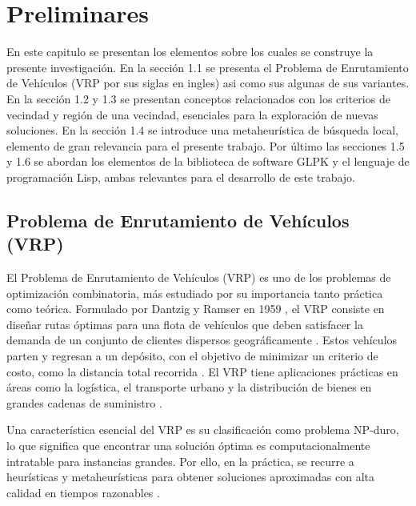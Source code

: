 \documentclass{article}
\begin{document}
\section{Preliminares}
En este capitulo se presentan los elementos sobre los cuales se construye la presente investigación. En la sección 1.1 se presenta el Problema de Enrutamiento de Vehículos (VRP por sus siglas en ingles) asi como sus algunas de sus variantes. En la sección 1.2 y 1.3 se presentan conceptos relacionados con los criterios de vecindad y región de una vecindad, esenciales para la exploración de nuevas soluciones. En la sección 1.4 se introduce una metaheurística de búsqueda local, elemento de gran relevancia para el presente trabajo. Por último las secciones 1.5 y 1.6  se abordan los elementos de la biblioteca de software GLPK y el lenguaje de programación Lisp, ambas relevantes para el desarrollo de este trabajo. 
\subsection{Problema de Enrutamiento de Vehículos (VRP)}
El Problema de Enrutamiento de Vehículos (VRP) es uno de los problemas de optimización combinatoria,  más estudiado por su importancia tanto práctica como teórica. Formulado por Dantzig y Ramser en 1959 \cite{ref18}, el VRP consiste en diseñar rutas óptimas para una flota de vehículos que deben satisfacer la demanda de un conjunto de clientes dispersos geográficamente \cite{ref2}. Estos vehículos parten y regresan a un depósito, con el objetivo de minimizar un criterio de costo, como la distancia total recorrida \cite{ref3}. El VRP tiene aplicaciones prácticas en áreas como la logística, el transporte urbano y la distribución de bienes en grandes cadenas de suministro \cite{ref8,ref10,ref11}.

Una característica esencial del VRP es su clasificación como problema NP-duro, lo que significa que encontrar una solución óptima es computacionalmente intratable para instancias grandes. Por ello, en la práctica, se recurre a heurísticas y metaheurísticas para obtener soluciones aproximadas con alta calidad en tiempos razonables \cite{ref7}.
\end{document}
